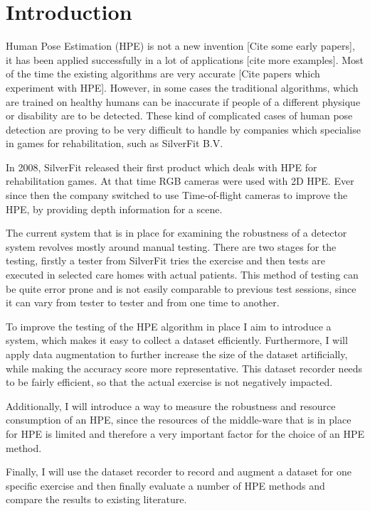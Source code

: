 \chapter{Introduction}


Human Pose Estimation (HPE) is not a new invention [Cite some early papers], it has been applied successfully in a lot of applications [cite more examples]. Most of the time the existing algorithms are very accurate [Cite papers which experiment with HPE]. However, in some cases the traditional algorithms, which are trained on healthy humans can be inaccurate if people of a different physique or disability are to be detected. These kind of complicated cases of human pose detection are proving to be very difficult to handle by companies which specialise in games for rehabilitation, such as SilverFit B.V.

In 2008, SilverFit released their first product which deals with HPE for rehabilitation games. At that time RGB cameras were used with 2D HPE. Ever since then the company switched to use Time-of-flight cameras to improve the HPE, by providing depth information for a scene.

The current system that is in place for examining the robustness of a detector system revolves mostly around manual testing. There are two stages for the testing, firstly a tester from SilverFit tries the exercise and then tests are executed in selected care homes with actual patients. This method of testing can be quite error prone and is not easily comparable to previous test sessions, since it can vary from tester to tester and from one time to another.

To improve the testing of the HPE algorithm in place I aim to introduce a system, which makes it easy to collect a dataset efficiently. Furthermore, I will apply data augmentation to further increase the size of the dataset artificially, while making the accuracy score more representative. This dataset recorder needs to be fairly efficient, so that the actual exercise is not negatively impacted. 

Additionally, I will introduce a way to measure the robustness and resource consumption of an HPE, since the resources of the middle-ware that is in place for HPE is limited and therefore a very important factor for the choice of an HPE method.

Finally, I will use the dataset recorder to record and augment a dataset for one specific exercise and then finally evaluate a number of HPE methods and compare the results to existing literature.

